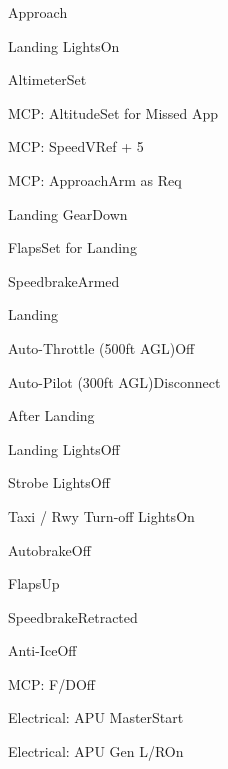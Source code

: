 \documentclass[sim-use, halfpage]{checklist}
\begin{document}
\begin{checklist}{Approach}
  \item{Landing Lights}{On}
  \item{Altimeter}{Set}
  \item{MCP: Altitude}{Set for Missed App}
  \item{MCP: Speed}{VRef + 5}
  \item{MCP: Approach}{Arm as Req}
  \item{Landing Gear}{Down}
  \item{Flaps}{Set for Landing}
  \item{Speedbrake}{Armed} 
\end{checklist}

\begin{checklist}{Landing}
  \item{Auto-Throttle (500ft AGL)}{Off}
  \item{Auto-Pilot (300ft AGL)}{Disconnect}
\end{checklist}

\begin{checklist}{After Landing}
  \item{Landing Lights}{Off}
  \item{Strobe Lights}{Off}
  \item{Taxi / Rwy Turn-off Lights}{On}
  \item{Autobrake}{Off}
  \item{Flaps}{Up}
  \item{Speedbrake}{Retracted}
  \item{Anti-Ice}{Off}
  \item{MCP: F/D}{Off}
  \item{Electrical: APU Master}{Start}
  \item{Electrical: APU Gen L/R}{On}
\end{checklist}
\end{document}

